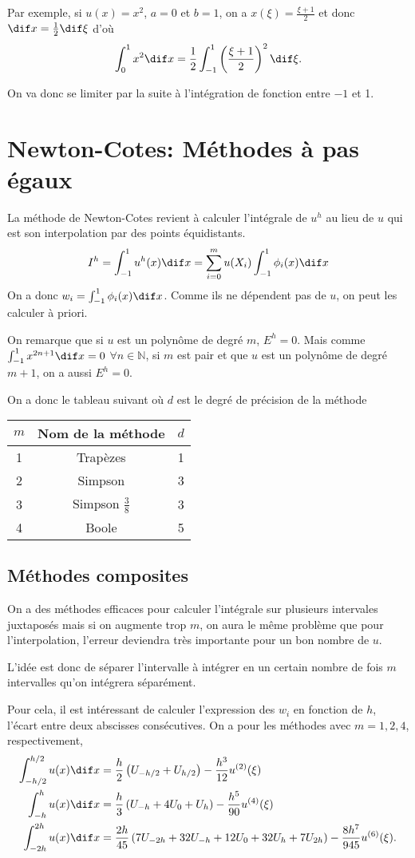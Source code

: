 Par exemple, si $u(x) = x^2$, $a = 0$ et $b = 1$,
on a $x(\xi) = \frac{\xi+1}{2}$ et donc $\dif x = \frac{1}{2}\dif \xi$ d'où
\[ \int_0^1 x^2 \dif x =
\frac{1}{2}\int_{-1}^1 \left(\frac{\xi+1}{2}\right)^2 \dif \xi. \]

On va donc se limiter par la suite à l'intégration de fonction entre $-1$ et 1.

\section{Newton-Cotes: Méthodes à pas égaux}
La méthode de Newton-Cotes revient à calculer l'intégrale de $u^h$ au lieu
de $u$ qui est son interpolation par des points équidistants.
\[ I^h = \int_{-1}^1 u^h(x) \dif x =
\sum_{i=0}^m u(X_i) \int_{-1}^1 \phi_i(x) \dif x \]
On a donc $w_i = \int_{-1}^1 \phi_i(x) \dif x$.
Comme ils ne dépendent pas de $u$, on peut les calculer à priori.

On remarque que si $u$ est un polynôme de degré $m$, $E^h = 0$.
Mais comme $\int_{-1}^1 x^{2n+1} \dif x = 0$ $\forall n \in \mathbb{N}$,
si $m$ est pair et que $u$ est un polynôme de degré $m+1$,
on a aussi $E^h = 0$.

On a donc le tableau suivant où $d$ est le degré de précision de la méthode
\begin{center}
  \begin{tabular}{|c|c|c|}
    \hline
    $m$ & Nom de la méthode & $d$\\
    \hline
    1 & Trapèzes & 1\\
    2 & Simpson & 3\\
    3 & Simpson $\frac{3}{8}$ & 3\\
    4 & Boole & 5\\
    \hline
  \end{tabular}
\end{center}

\subsection{Méthodes composites}
On a des méthodes efficaces pour calculer l'intégrale sur plusieurs
intervales juxtaposés mais si on augmente trop $m$, on aura le même problème
que pour l'interpolation, l'erreur deviendra très importante pour un bon
nombre de $u$.

L'idée est donc de séparer l'intervalle à intégrer en un certain nombre
de fois $m$ intervalles qu'on intégrera séparément.

Pour cela, il est intéressant de calculer l'expression des $w_i$
en fonction de $h$, l'écart entre deux abscisses consécutives.
On a pour les méthodes avec $m = 1, 2, 4$, respectivement,
\begin{align*}
  \int_{-h/2}^{h/2}u(x)\dif x & =
  \frac{h}{2} \left(U_{-h/2} + U_{h/2}\right)
  -\frac{h^3}{12}u^{(2)}(\xi)\\
  \int_{-h}^{h}u(x)\dif x & =
  \frac{h}{3} \left(U_{-h} + 4 U_0 + U_{h}\right)
  -\frac{h^5}{90}u^{(4)}(\xi)\\
  \int_{-2h}^{2h}u(x)\dif x & =
  \frac{2h}{45}
  \left(7U_{-2h} + 32U_{-h} +12U_0 + 32U_{h} + 7U_{2h}\right)
  -\frac{8h^7}{945}u^{(6)}(\xi).
\end{align*}
